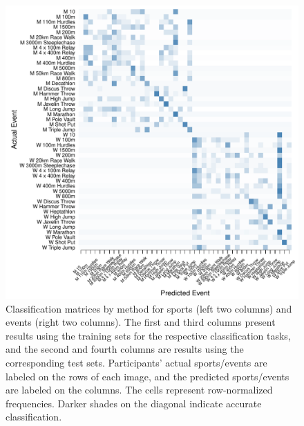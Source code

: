 \begin{figure}
\begin{center}
\begin{minipage}{0.20\textwidth}
\begin{center}
    \end{center}
  \end{minipage}
  \hspace{0.05\textwidth}
  \begin{minipage}{0.20\textwidth}
    \begin{center}
      \includegraphics[scale=0.20]{../graphics/athletesANN-tst.pdf}
    \end{center}
  \end{minipage}

  \end{center}

\caption{Classification matrices by method for sports (left two columns) and events (right two columns). The first and third columns present results using the training sets for the respective classification tasks, and the second and fourth columns are results using the corresponding test sets. Participants' actual sports/events are labeled on the rows of each image, and the predicted sports/events are labeled on the columns. The cells represent row-normalized frequencies. Darker shades on the diagonal indicate accurate classification.}
\label{matrices}
\end{figure}